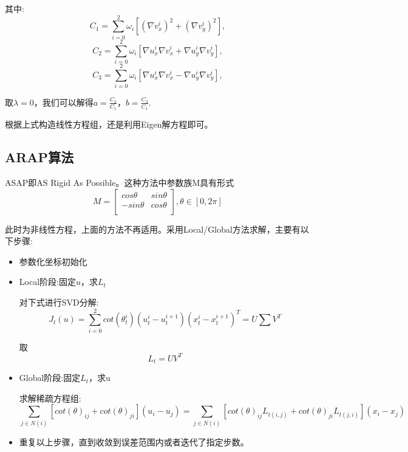 \documentclass{article}
\begin{document}
其中: $$ C_1 = \sum_{i=0}^2\omega_i[(\nabla v_x^i)^2+ (\nabla v_y^i)^2] ,$$
$$ C_2 = \sum_{i=0}^2\omega_i[\nabla u_x^i \nabla v_x^i+ \nabla u_y^i \nabla v_y^i] ,$$
$$ C_3 = \sum_{i=0}^2\omega_i[\nabla u_x^i \nabla v_x^i- \nabla u_y^i \nabla v_y^i] ,$$

取$\lambda=0$，我们可以解得$ a=\frac{C_2}{C_1}$，$b=\frac{C_3}{C_1}$.

根据上式构造线性方程组，还是利用Eigen解方程即可。

	
	\subsection{ARAP算法}
	
		ASAP即AS Rigid As Possible。这种方法中参数族M具有形式
	$$
	M = \left[ \begin{array}{cc}
		cos\theta & sin\theta \\
		-sin\theta & cos\theta \\
	\end{array} \right],\theta \in [0,2\pi]
	$$
	
	此时为非线性方程，上面的方法不再适用。采用Local/Global方法求解，主要有以下步骤:
	
		\begin{itemize}
		\item 参数化坐标初始化
	\end{itemize}

	\begin{itemize}
	\item Local阶段:固定$u$，求$L_t$
	
	对下式进行SVD分解:
	     $$ J_t(u) =  \sum_{i=0}^{2} cot(\theta_t^i)  (u_t^i-u_t^{i+1}) (x_t^i-x_t^{i+1})^T = U\sum V^T   $$
	     
	 取  $$ L_t=UV^T $$ 
	
\end{itemize}

	\begin{itemize}
	\item Global阶段:固定$L_t$，求u
	
	求解稀疏方程组:
	$$ \sum_{j\in N(i)} [cot(\theta)_{ij}+cot(\theta)_{ji}](u_i-u_j) = \sum_{j\in N(i)} [cot(\theta)_{ij}L_{t(i,j)}+cot(\theta)_{ji}L_{t(j,i)}](x_i-x_j)  $$
	
   \end{itemize}

	\begin{itemize}
	\item 重复以上步骤，直到收敛到误差范围内或者迭代了指定步数。
    \end{itemize}
	
\end{document}
